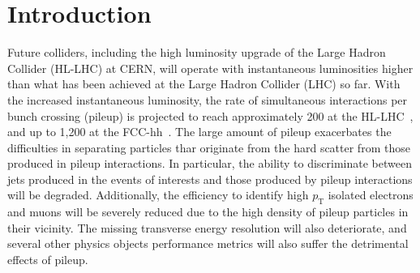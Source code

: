 \documentclass[preprint,1p]{elsarticle}
\begin{document}
\tableofcontents


\section{Introduction} 

Future colliders, including the high luminosity upgrade of the Large Hadron
Collider (HL-LHC) at CERN, will operate with instantaneous luminosities higher
than what has been achieved at the Large Hadron Collider (LHC) so far. With the
increased instantaneous luminosity, the rate of simultaneous interactions per
bunch crossing (pileup) is projected to reach approximately 200 at the
HL-LHC~\cite{Apollinari:2120673}, and up to 1,200 at the
FCC-hh~\cite{Schulte:2017qkc}. The large amount of pileup exacerbates the
difficulties in separating particles thar originate from the hard scatter from
those produced in pileup interactions. In particular, the ability to
discriminate between jets produced in the events of interests and those produced
by pileup interactions will be degraded. Additionally, the efficiency to
identify high $p_{\mathrm{T}}$ isolated electrons and muons will be severely
reduced due to the high density of pileup particles in their vicinity. The
missing transverse energy resolution will also deteriorate, and several other
physics objects performance metrics will also suffer the detrimental effects of
pileup.
\end{document}
